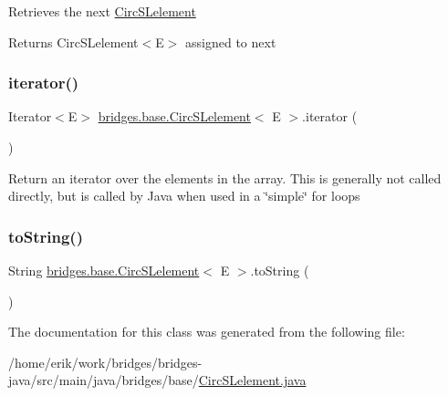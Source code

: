 Retrieves the next \hyperlink{classbridges_1_1base_1_1_circ_s_lelement}{Circ\+S\+Lelement}

\begin{DoxyReturn}{Returns}
Circ\+S\+Lelement$<$\+E$>$ assigned to next 
\end{DoxyReturn}
\mbox{\label{classbridges_1_1base_1_1_circ_s_lelement_a17113bdda16d92021aaa29186786848f}} 
\subsubsection{\texorpdfstring{iterator()}{iterator()}}
{\footnotesize\ttfamily Iterator$<$E$>$ \hyperlink{classbridges_1_1base_1_1_circ_s_lelement}{bridges.\+base.\+Circ\+S\+Lelement}$<$ E $>$.iterator (\begin{DoxyParamCaption}{ }\end{DoxyParamCaption})}

Return an iterator over the elements in the array. This is generally not called directly, but is called by Java when used in a \char`\"{}simple\char`\"{} for loops \mbox{\label{classbridges_1_1base_1_1_circ_s_lelement_af307188926766e73efb988f102ce9740}} 
\subsubsection{\texorpdfstring{to\+String()}{toString()}}
{\footnotesize\ttfamily String \hyperlink{classbridges_1_1base_1_1_circ_s_lelement}{bridges.\+base.\+Circ\+S\+Lelement}$<$ E $>$.to\+String (\begin{DoxyParamCaption}{ }\end{DoxyParamCaption})}



The documentation for this class was generated from the following file\+:\begin{DoxyCompactItemize}
\item 
/home/erik/work/bridges/bridges-\/java/src/main/java/bridges/base/\hyperlink{_circ_s_lelement_8java}{Circ\+S\+Lelement.\+java}\end{DoxyCompactItemize}

